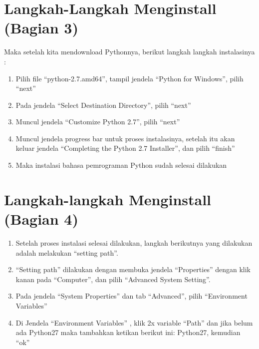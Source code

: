 \documentclass[12pt, times new roman, a4paper]{article}
\begin{document}
\section{Langkah-Langkah Menginstall (Bagian 3)}
Maka setelah kita mendownload Pythonnya, berikut langkah langkah instalasinya :
\begin{enumerate}
  \item Pilih file “python-2.7.amd64”, tampil jendela “Python for Windows”, pilih “next”
  \item Pada jendela “Select Destination Directory”, pilih “next” 
  \item Muncul jendela “Customize Python 2.7”, pilih “next” 
  \item Muncul jendela progress bar untuk proses instalasinya, setelah itu akan keluar jendela “Completing the Python 2.7 Installer”, dan pilih “finish”
  \item Maka instalasi bahasa pemrograman Python sudah selesai dilakukan
\end{enumerate}

\section{Langkah-langkah Menginstall (Bagian 4)}
\begin{enumerate}
  \item Setelah proses instalasi selesai dilakukan, langkah berikutnya yang
dilakukan adalah melakukan “setting path”.
  \item “Setting path” dilakukan dengan membuka jendela “Properties” dengan klik
kanan pada “Computer”, dan pilih “Advanced System Setting”. 
  \item Pada jendela “System Properties” dan tab “Advanced”, pilih “Environment
Variables” 
  \item Di Jendela “Environment Variables” , klik 2x variable “Path” dan
jika belum ada Python27 maka tambahkan ketikan berikut ini: Python27, kemudian “ok”
\end{enumerate}
\end{document}
